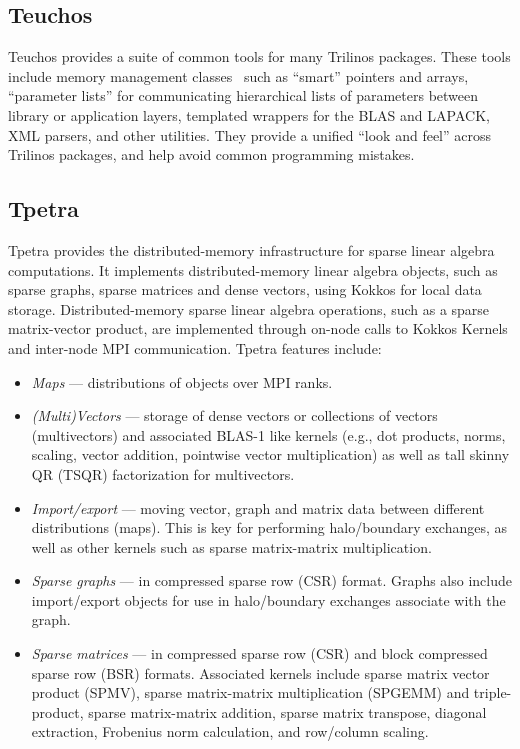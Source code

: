 
\subsection{Teuchos}

Teuchos provides a suite of common tools for many Trilinos packages. These tools include memory management classes~\cite{bartlett2010} such as ``smart'' pointers and arrays, ``parameter lists'' for communicating hierarchical lists of parameters between library or application layers, templated wrappers for the BLAS and LAPACK, XML parsers, and other utilities. They provide a unified ``look and feel'' across Trilinos packages, and help avoid common programming mistakes.



\subsection{Tpetra}\label{subsec:tpetra}
Tpetra \cite{hoemmen2015tpetra} provides the distributed-memory
infrastructure for sparse linear algebra computations.  It implements
distributed-memory linear algebra objects, such as sparse graphs,
sparse matrices and dense vectors, using Kokkos for local data
storage.  Distributed-memory sparse linear algebra operations, such as
a sparse matrix-vector product, are implemented through on-node calls
to Kokkos Kernels and inter-node MPI communication.   Tpetra features
include:
\begin{itemize}
\item \textit{Maps} --- distributions of objects over MPI ranks.
\item \textit{(Multi)Vectors} --- storage of dense vectors or collections of
vectors (multivectors) and associated BLAS-1 like kernels (e.g., dot
products, norms, scaling, vector addition, pointwise vector
multiplication) as well as tall skinny QR (TSQR)  factorization for multivectors.
\item \textit{Import/export} --- moving vector, graph and matrix data
between different distributions (maps).  This is key for performing
halo/boundary exchanges, as well as other kernels such as
sparse matrix-matrix multiplication.
\item \textit{Sparse graphs} --- in compressed sparse row (CSR)
format.  Graphs also include import/export objects for use in
halo/boundary exchanges associate with the graph.
\item \textit{Sparse matrices} --- in compressed sparse row (CSR) and
block compressed sparse row (BSR) formats.  Associated kernels include
sparse matrix vector product (SPMV), sparse matrix-matrix
multiplication (SPGEMM) and triple-product, sparse matrix-matrix addition, sparse matrix transpose, diagonal extraction,
Frobenius norm calculation, and row/column scaling.
\end{itemize}

